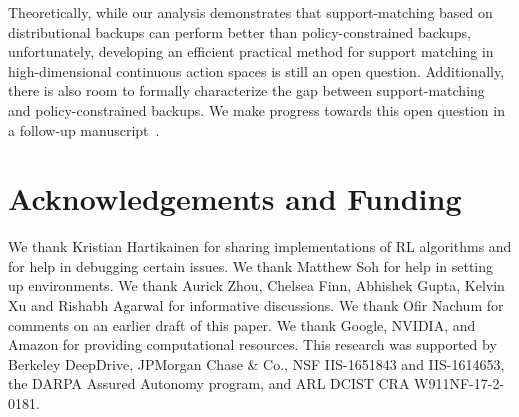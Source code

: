 Theoretically, while our analysis demonstrates that support-matching based on distributional backups can perform better than policy-constrained backups, unfortunately, developing an efficient practical method for support matching in high-dimensional continuous action spaces is still an open question. Additionally, there is also room to formally characterize the gap between support-matching and policy-constrained backups. We make progress towards this open question in a follow-up manuscript~\citep{singh2022offline}.  

\section*{Acknowledgements and Funding}
We thank Kristian Hartikainen for sharing implementations of RL algorithms and for help in debugging certain issues. We thank Matthew Soh for help in setting up environments. We thank Aurick Zhou, Chelsea Finn, Abhishek Gupta, Kelvin Xu and Rishabh Agarwal for informative discussions. We thank Ofir Nachum for comments on an earlier draft of this paper. We thank Google, NVIDIA, and Amazon for providing computational resources. This research was supported by Berkeley DeepDrive, JPMorgan Chase \& Co., NSF IIS-1651843 and IIS-1614653, the DARPA Assured Autonomy program, and ARL DCIST CRA W911NF-17-2-0181.